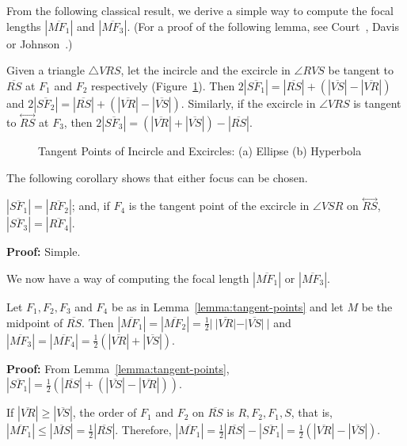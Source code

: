      From the following classical result, we derive a simple way to compute
the focal lengths $|\overline{MF_1}|$ and $|\overline{MF_3}|$.
(For a proof of the following lemma, 
see Court~\cite{court:1925},  Davis~\cite{davis:1949} or
Johnson~\cite{johnson:1929}.)

\begin{lemma}
\label{lemma:tangent-points}
     Given a triangle $\bigtriangleup VRS$, let the incircle and the excircle
in $\angle RVS$ be tangent to $\overline{RS}$ at $F_1$ and $F_2$ respectively
(Figure~\ref{fig:tangent-points}).  Then 
$2|\overline{SF_1}|=|\overline{RS}|+(|\overline{VS}|-|\overline{VR}|)$ and
$2|\overline{SF_2}|=|\overline{RS}|+(|\overline{VR}|-|\overline{VS}|)$.  
Similarly, if the excircle in $\angle VRS$ is tangent to 
$\stackrel{\longleftrightarrow}{RS}$ at $F_3$, then
$2|\overline{SF_3}|=(|\overline{VR}|+|\overline{VS}|)-|\overline{RS}|$.
\end{lemma}
\begin{figure}
\vspace{6cm}
\caption{Tangent Points of Incircle and Excircles: (a) Ellipse (b) Hyperbola}
\label{fig:tangent-points}
\end{figure}

The following corollary shows that either focus can be chosen.

\begin{corollary}
$|\overline{SF_1}|=|\overline{RF_2}|$; and, if $F_4$ is the tangent point of
the excircle in $\angle VSR$ on $\stackrel{\longleftrightarrow}{RS}$,
$|\overline{SF_3}|=|\overline{RF_4}|$.
\end{corollary}
{\bf Proof:} Simple. \QED

We now have a way of computing the focal length $|\overline{MF_1}|$ or
$|\overline{MF_3}|$.

\begin{lemma}
\label{lemma:focal-length}
     Let $F_1,F_2,F_3$ and $F_4$ be as in Lemma~\ref{lemma:tangent-points} 
and let $M$ be the midpoint of $\overline{RS}$.
Then $|\overline{MF_1}|=|\overline{MF_2}|
=\frac{1}{2}|\ |\overline{VR}|-|\overline{VS}|\ |$ and
$|\overline{MF_3}|=|\overline{MF_4}|
=\frac{1}{2}(|\overline{VR}|+|\overline{VS}|)$.
\end{lemma}
{\bf Proof:} From Lemma~\ref{lemma:tangent-points}, 
$|\overline{SF_1}|=
\frac{1}{2}(|\overline{RS}|+(|\overline{VS}|-|\overline{VR}|))$.

If $|\overline{VR}|\geq|\overline{VS}|$, the order of $F_1$ and $F_2$ on
$\overline{RS}$ is $R,F_2,F_1,S$, that is, 
$|\overline{MF_1}|\leq|\overline{MS}|=\frac{1}{2}|\overline{RS}|$.
Therefore, $|\overline{MF_1}|=\frac{1}{2}|\overline{RS}|-
|\overline{SF_1}|=\frac{1}{2}(|\overline{VR}|-|\overline{VS}|)$.

